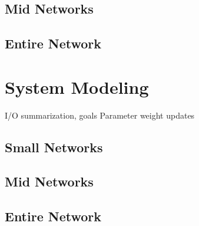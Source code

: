 \subsection{Mid Networks}

\subsection{Entire Network}

\section{System Modeling}

I/O summarization, goals
Parameter weight updates

\subsection{Small Networks}

\subsection{Mid Networks}

\subsection{Entire Network}